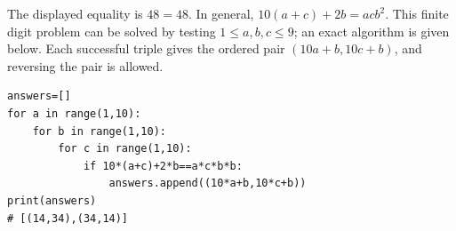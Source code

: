 The displayed equality is $48=48$. In general, $10(a+c)+2b=acb^2$. This finite digit problem can be solved by testing $1\le a,b,c\le9$; an exact algorithm is given below. Each successful triple gives the ordered pair $(10a+b,10c+b)$, and reversing the pair is allowed.\begin{verbatim}
answers=[]
for a in range(1,10):
    for b in range(1,10):
        for c in range(1,10):
            if 10*(a+c)+2*b==a*c*b*b:
                answers.append((10*a+b,10*c+b))
print(answers)
# [(14,34),(34,14)]
\end{verbatim}
